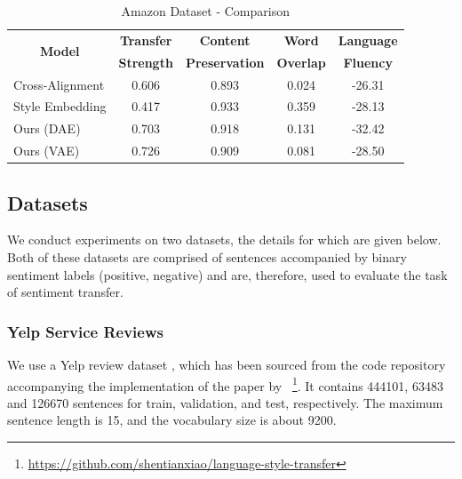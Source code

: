 \documentclass[letterpaper]{article} %
\newcommand{\tabh}[1]{\multicolumn{1}{c|}{\textbf{#1}}}
\newcommand{\tabc}[2]{\multicolumn{1}{|c||}{\multirow{#1}{*}{\textbf{#2}}}}
\newcommand{\citeay}[1]{\citeauthor{#1} \shortcite{#1}}
\begin{document}
\begin{table}[ht]
	\centering
	\begin{tabular}{| l || c | c | c | c |}
		\hline
		\tabc{2}{Model}                      & \tabh{Transfer} & \tabh{Content}      & \tabh{Word}    & \tabh{Language} \\
		                                     & \tabh{Strength} & \tabh{Preservation} & \tabh{Overlap} & \tabh{Fluency}  \\
		\hline
		\hline
		Cross-Alignment \cite{shen2017style} & 0.606           & 0.893               & 0.024          & -26.31          \\
		\hline
		Style Embedding \cite{fu2017style}   & 0.417           & 0.933               & 0.359          & -28.13          \\
		\hline
		Ours (DAE)                           & 0.703           & 0.918               & 0.131          & -32.42          \\
		\hline
		Ours (VAE)                           & 0.726           & 0.909               & 0.081          & -28.50          \\
		\hline
	\end{tabular}
	\caption{Amazon Dataset - Comparison}
	\label{tab:amazon-comparison-previous}
\end{table}

\subsection{Datasets}

We conduct experiments on two datasets, the details for which are given below. Both of these datasets are comprised of sentences accompanied by binary sentiment labels (positive, negative) and are, therefore, used to evaluate the task of sentiment transfer.

\subsubsection{Yelp Service Reviews}

We use a Yelp review dataset \cite{challenge2013yelp}, which has been sourced from the code repository accompanying the implementation of the paper by \citeay{shen2017style}~\footnote{\url{https://github.com/shentianxiao/language-style-transfer}}. It contains 444101, 63483 and 126670 sentences for train, validation, and test, respectively. The maximum sentence length is 15, and the vocabulary size is about 9200.
\end{document}

